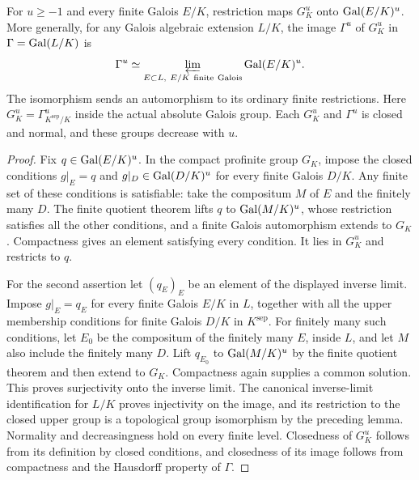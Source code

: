 \begin{proposition}
\label{fw:absolute-upper-projections}
\leanok
For $u\geq-1$ and every finite Galois $E/K$, restriction maps $G_K^u$ onto
$\operatorname{Gal}(E/K)^u$. More generally, for any Galois algebraic extension $L/K$,
the image $\Gamma^u$ of $G_K^u$ in $\Gamma=\operatorname{Gal}(L/K)$ is
\[
 \Gamma^u\simeq\varprojlim_{E\subset L,\ E/K\ \mathrm{finite\ Galois}}
                   \Gal(E/K)^u.
\]
The isomorphism sends an automorphism to its ordinary finite restrictions.
Here $G_K^u=\Gamma_{K^{\mathrm{sep}}/K}^u$ inside the actual absolute
Galois group. Each $G_K^u$ and $\Gamma^u$ is closed and normal, and these groups
decrease with $u$.
\end{proposition}
\begin{proof}
Fix $q\in\operatorname{Gal}(E/K)^u$. In the compact profinite group $G_K$, impose
the closed conditions $g|_E=q$ and
$g|_D\in\operatorname{Gal}(D/K)^u$ for every finite Galois $D/K$.
Any finite set of these conditions is satisfiable: take the compositum
$M$ of $E$ and the finitely many $D$. The finite quotient theorem lifts
$q$ to $\operatorname{Gal}(M/K)^u$, whose restriction satisfies all the other
conditions, and a finite Galois automorphism extends to $G_K$.
Compactness gives an element satisfying every condition. It lies in
$G_K^u$ and restricts to $q$.

For the second assertion let $(q_E)_E$ be an element of the displayed
inverse limit. Impose $g|_E=q_E$ for every finite Galois $E/K$ in $L$,
together with all the upper membership conditions for finite Galois
$D/K$ in $K^{\mathrm{sep}}$. For finitely many such conditions, let
$E_0$ be the compositum of the finitely many $E$, inside $L$, and let
$M$ also include the finitely many $D$. Lift $q_{E_0}$ to
$\operatorname{Gal}(M/K)^u$ by the finite quotient theorem and then extend to $G_K$.
Compactness again supplies a common solution. This proves surjectivity
onto the inverse limit. The canonical inverse-limit identification for
$L/K$ proves injectivity on the image, and its restriction to the closed
upper group is a topological group isomorphism by the preceding lemma.
Normality and decreasingness hold on every finite level. Closedness of
$G_K^u$ follows from its definition by closed conditions, and closedness
of its image follows from compactness and the Hausdorff property of
$\Gamma$.
\end{proof}


